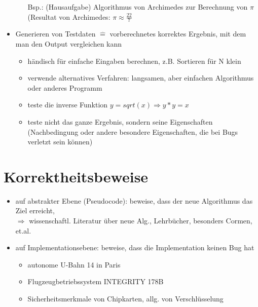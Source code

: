\begin{itemize}
\begin{itemize}
            Bsp.: (Hausaufgabe) Algorithmus von Archimedes zur Berechnung von $\pi$\\ \hspace*{0,9cm}(Resultat von Archimedes: $\pi \approx \frac{22}{7}$
        \end{itemize}
        \item Generieren von Testdaten $\widehat{=}$ vorberechnetes korrektes Ergebnis, mit dem man den Output vergleichen kann
        \begin{itemize}
            \item händisch für einfache Eingaben berechnen, z.B. Sortieren für N klein
            \item verwende alternatives Verfahren: langsamen, aber einfachen Algorithmus oder anderes Programm
            \item teste die inverse Funktion $y = sqrt(x) \Rightarrow y*y = x$
            \item teste nicht das ganze Ergebnis, sondern seine Eigenschaften (Nachbedingung oder andere besondere Eigenschaften, die bei Bugs verletzt sein können)
        \end{itemize}
    \end{itemize}

    \section{Korrektheitsbeweise}
    \begin{itemize}
        \item auf abstrakter Ebene (Pseudocode): beweise, dass der neue Algorithmus das Ziel erreicht, \\
        $\Rightarrow$ wissenschaftl. Literatur über neue Alg., Lehrbücher, besonders Cormen, et.al.
        \item auf Implementationsebene: beweise, dass die Implementation keinen Bug hat
        \begin{itemize}
            \item autonome U-Bahn 14 in Paris
            \item Flugzeugbetriebssystem INTEGRITY 178B
            \item Sicherheitsmerkmale von Chipkarten, allg. von Verschlüsselung
        \end{itemize}
    \end{itemize}

